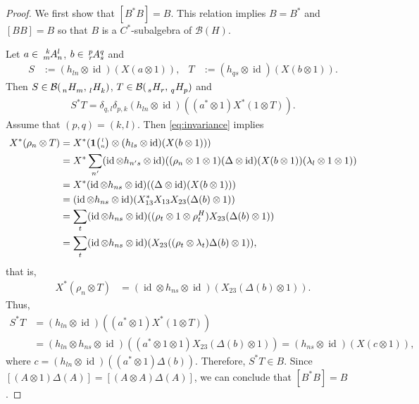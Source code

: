 \documentclass[11pt]{article}
\DeclareMathOperator{\id}{id}
\newcommand{\Grt}[3]{#1{\tiny {\begin{pmatrix} #2\\#3\end{pmatrix}}}}
\newcommand{\UnitC}[2]{\Grt{\mathbf{1}}{#1}{#2}}
\newcommand{\Gr}[5]{\,\tensor*[^{#2}_{#4}]{#1}{^{#3}_{#5}}}%
\newcommand{\Grd}[3]{\Gr{#1}{}{}{#2}{#3}}
\theoremstyle{definition}
\numberwithin{equation}{section}
\begin{document}
  \begin{proof}
We first show that $[B^{*}B]= B$. This relation implies $B=B^{*}$ and
$[BB]=B$ so that $B$ is a $C^{*}$-subalgebra of $\mathcal{B}(H)$. 

 Let $a\in \Gr{A}{k}{l}{m}{n}$, $b\in \Gr{A}{p}{q}{r}{s}$ and
 \begin{align*}
   S&:=(h_{ln} \otimes \id)(X(a\otimes 1)), &
   T&:=(h_{qs} \otimes \id)(X(b\otimes 1)).
 \end{align*}
Then  $S \in \mathcal{B}(\Grd{H}{n}{m},\Grd{H}{l}{k})$, $T\in
\mathcal{B}(\Grd{H}{s}{r},\Grd{H}{q}{p})$ and
\begin{align*}
  S^{*}T = \delta_{q,l}\delta_{p,k} (h_{ln} \otimes \id)((a^{*}\otimes
  1)X^{*}(1\otimes T)).
\end{align*}
Assume that $(p,q)=(k,l)$.  Then \eqref{eq:invariance} implies
\begin{align*}
 X^{*}(\rho_{n}\otimes T) &=  X^{*}(\UnitC{l}{n} \otimes (h_{ls} \otimes
  \id)(X(b\otimes 1))) \\
  &=  X^{*} \sum_{n'}(\id \otimes h_{n's}\otimes
  \id)((\rho_n\otimes 1\otimes 1)(\Delta\otimes \id)(X(b\otimes 1))(\lambda_l\otimes 1 \otimes 1))\\
  &=  X^{*}(\id \otimes h_{ns}\otimes
  \id)((\Delta\otimes \id)(X(b\otimes 1))) \\
  &=    (\id \otimes h_{ns}\otimes
  \id)(X^{*}_{13}X_{13}X_{23}(\Delta(b)\otimes 1)) \\
  &= \sum_{t}(\id \otimes h_{ns} \otimes
  \id)((\rho_{t} \otimes 1\otimes \rho^{H}_{t})X_{23}(\Delta(b)\otimes
  1)) \\
&= \sum_{t}(\id \otimes h_{ns} \otimes
  \id)(X_{23}((\rho_{t}\otimes \lambda_{t})\Delta(b)\otimes
  1)), 
\end{align*}
that is,
\begin{align}\label{eq:corep-complemented}
  X^{*}(\rho_{n}\otimes T) &=
 (\id \otimes h_{ns} \otimes
  \id)(X_{23}(\Delta(b)\otimes 1)).
\end{align}
Thus,
\begin{align*}
  S^{*}T &= (h_{ln} \otimes \id)((a^{*}\otimes
  1)X^{*}(1\otimes T))  \\ &= (h_{ln} \otimes h_{ns} \otimes
  \id)((a^{*} \otimes 1\otimes 1)X_{23}(\Delta(b) \otimes 1)) 
  =(h_{ns} \otimes \id)(X(c\otimes 1)), 
\end{align*}
where $c=(h_{ln} \otimes \id)((a^{*}\otimes 1)\Delta(b))$. Therefore,
$S^{*}T \in B$. Since $[(A\otimes 1)\Delta(A)]=[(A\otimes
A)\Delta(A)]$, we can conclude that $[B^{*}B]=B$.



\end{proof}
\end{document}

